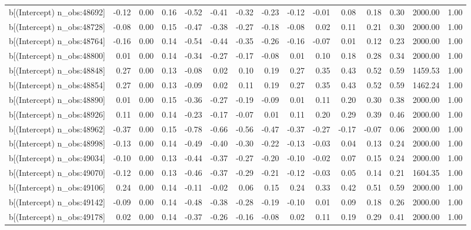 \begin{table}[ht]
\begin{tabular}{rrrrrrrrrrrrrrr}
  b[(Intercept) n\_obs:48692] & -0.12 & 0.00 & 0.16 & -0.52 & -0.41 & -0.32 & -0.23 & -0.12 & -0.01 & 0.08 & 0.18 & 0.30 & 2000.00 & 1.00 \\ 
  b[(Intercept) n\_obs:48728] & -0.08 & 0.00 & 0.15 & -0.47 & -0.38 & -0.27 & -0.18 & -0.08 & 0.02 & 0.11 & 0.21 & 0.30 & 2000.00 & 1.00 \\ 
  b[(Intercept) n\_obs:48764] & -0.16 & 0.00 & 0.14 & -0.54 & -0.44 & -0.35 & -0.26 & -0.16 & -0.07 & 0.01 & 0.12 & 0.23 & 2000.00 & 1.00 \\ 
  b[(Intercept) n\_obs:48800] & 0.01 & 0.00 & 0.14 & -0.34 & -0.27 & -0.17 & -0.08 & 0.01 & 0.10 & 0.18 & 0.28 & 0.34 & 2000.00 & 1.00 \\ 
  b[(Intercept) n\_obs:48848] & 0.27 & 0.00 & 0.13 & -0.08 & 0.02 & 0.10 & 0.19 & 0.27 & 0.35 & 0.43 & 0.52 & 0.59 & 1459.53 & 1.00 \\ 
  b[(Intercept) n\_obs:48854] & 0.27 & 0.00 & 0.13 & -0.09 & 0.02 & 0.11 & 0.19 & 0.27 & 0.35 & 0.43 & 0.52 & 0.59 & 1462.24 & 1.00 \\ 
  b[(Intercept) n\_obs:48890] & 0.01 & 0.00 & 0.15 & -0.36 & -0.27 & -0.19 & -0.09 & 0.01 & 0.11 & 0.20 & 0.30 & 0.38 & 2000.00 & 1.00 \\ 
  b[(Intercept) n\_obs:48926] & 0.11 & 0.00 & 0.14 & -0.23 & -0.17 & -0.07 & 0.01 & 0.11 & 0.20 & 0.29 & 0.39 & 0.46 & 2000.00 & 1.00 \\ 
  b[(Intercept) n\_obs:48962] & -0.37 & 0.00 & 0.15 & -0.78 & -0.66 & -0.56 & -0.47 & -0.37 & -0.27 & -0.17 & -0.07 & 0.06 & 2000.00 & 1.00 \\ 
  b[(Intercept) n\_obs:48998] & -0.13 & 0.00 & 0.14 & -0.49 & -0.40 & -0.30 & -0.22 & -0.13 & -0.03 & 0.04 & 0.13 & 0.24 & 2000.00 & 1.00 \\ 
  b[(Intercept) n\_obs:49034] & -0.10 & 0.00 & 0.13 & -0.44 & -0.37 & -0.27 & -0.20 & -0.10 & -0.02 & 0.07 & 0.15 & 0.24 & 2000.00 & 1.00 \\ 
  b[(Intercept) n\_obs:49070] & -0.12 & 0.00 & 0.13 & -0.46 & -0.37 & -0.29 & -0.21 & -0.12 & -0.03 & 0.05 & 0.14 & 0.21 & 1604.35 & 1.00 \\ 
  b[(Intercept) n\_obs:49106] & 0.24 & 0.00 & 0.14 & -0.11 & -0.02 & 0.06 & 0.15 & 0.24 & 0.33 & 0.42 & 0.51 & 0.59 & 2000.00 & 1.00 \\ 
  b[(Intercept) n\_obs:49142] & -0.09 & 0.00 & 0.14 & -0.48 & -0.38 & -0.28 & -0.19 & -0.10 & 0.01 & 0.09 & 0.18 & 0.26 & 2000.00 & 1.00 \\ 
  b[(Intercept) n\_obs:49178] & 0.02 & 0.00 & 0.14 & -0.37 & -0.26 & -0.16 & -0.08 & 0.02 & 0.11 & 0.19 & 0.29 & 0.41 & 2000.00 & 1.00 \\ 

\end{tabular}
\end{table}
